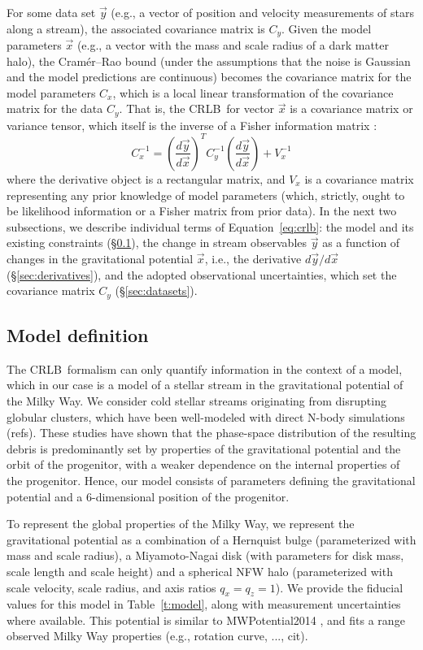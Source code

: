 \documentclass[modern]{aastex61}
\newcommand{\acronym}[1]{{\small{#1}}}
\newcommand{\CRLB}{\acronym{CRLB}}
\begin{document}
For some data set $\vec{y}$ (e.g., a vector of position and velocity measurements of stars along a stream), the associated covariance matrix is $C_y$.
Given the model parameters $\vec{x}$ (e.g., a vector with the mass and scale radius of a dark matter halo), the Cram\' er--Rao bound (under the assumptions that the noise is Gaussian and the model predictions are continuous) becomes the covariance matrix for the model parameters $C_x$, which is a local linear transformation of the covariance matrix for the data $C_y$.
That is, the \CRLB\ for vector $\vec{x}$ is a covariance matrix or variance tensor, which itself is the inverse of a Fisher information matrix \citep{}:
\begin{equation}
C_x^{-1} = \left(\frac{d\vec{y}}{d\vec{x}}\right)^{T} C_y^{-1} \left(\frac{d\vec{y}}{d\vec{x}}\right) + V_x^{-1}
\label{eq:crlb}
\end{equation}
where the derivative object is a rectangular matrix, and $V_x$ is a covariance matrix representing any prior knowledge of model parameters (which, strictly, ought to be likelihood information or a Fisher matrix from prior data).
In the next two subsections, we describe individual terms of Equation~\ref{eq:crlb}: the model and its existing constraints (\S\ref{sec:model}), the change in stream observables $\vec{y}$ as a function of changes in the gravitational potential $\vec{x}$, i.e., the derivative $d\vec{y}/d\vec{x}$ (\S\ref{sec:derivatives}), and the adopted observational uncertainties, which set the covariance matrix $C_y$ (\S\ref{sec:datasets}).

\subsection{Model definition}
\label{sec:model}
The \CRLB\ formalism can only quantify information in the context of a model, which in our case is a model of a stellar stream in the gravitational potential of the Milky Way.
We consider cold stellar streams originating from disrupting globular clusters, which have been well-modeled with direct N-body simulations (refs).
These studies have shown that the phase-space distribution of the resulting debris is predominantly set by properties of the gravitational potential and the orbit of the progenitor, with a weaker dependence on the internal properties of the progenitor.
Hence, our model consists of parameters defining the gravitational potential and a 6-dimensional position of the progenitor.

To represent the global properties of the Milky Way, we represent the gravitational potential as a combination of a Hernquist bulge (parameterized with mass and scale radius), a Miyamoto-Nagai disk (with parameters for disk mass, scale length and scale height) and a spherical NFW halo (parameterized with scale velocity, scale radius, and axis ratios $q_x=q_z=1$).
We provide the fiducial values for this model in Table~\ref{t:model}, along with measurement uncertainties where available.
This potential is similar to MWPotential2014 \citep{galpy}, and fits a range observed Milky Way properties (e.g., rotation curve, ..., cit).
\end{document}

